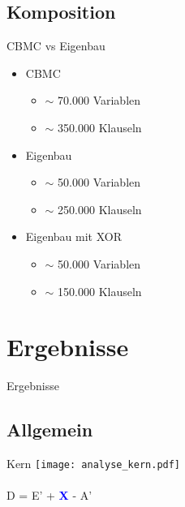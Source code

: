 \documentclass{beamer}
\begin{document}
  \subsection{Komposition}
  \begin{frame}{CBMC vs Eigenbau}
    \begin{itemize}
      \item CBMC
      \begin{itemize}
        \item $ \sim $ 70.000 Variablen
        \item $ \sim $ 350.000 Klauseln
      \end{itemize}
      \item Eigenbau
      \begin{itemize}
        \item $ \sim $ 50.000 Variablen
        \item $ \sim $ 250.000 Klauseln
      \end{itemize}
      \item Eigenbau mit XOR
      \begin{itemize}
        \item $ \sim $ 50.000 Variablen
        \item $ \sim $ 150.000 Klauseln
      \end{itemize}
    \end{itemize}
  \end{frame}

\section{Ergebnisse}
  \begin{frame}{}
    \begin{center}
      \Huge Ergebnisse
    \end{center}
  \end{frame}
  \subsection{Allgemein}
    \begin{frame}{Kern}
      \texttt{[image: analyse\_kern.pdf]}\\
      ~\\
      D = E' + \textcolor{blue}{\textbf{X}} - A'\\
    \end{frame}
\end{document}
